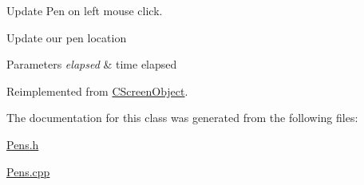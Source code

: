 Update Pen on left mouse click. 

Update our pen location 
\begin{DoxyParams}{Parameters}
{\em elapsed} & time elapsed \\
\hline
\end{DoxyParams}


Reimplemented from \mbox{\hyperlink{class_c_screen_object_ab682c1e08f001e666f0cec280e1e9eaa}{C\+Screen\+Object}}.



The documentation for this class was generated from the following files\+:\begin{DoxyCompactItemize}
\item 
\mbox{\hyperlink{_pens_8h}{Pens.\+h}}\item 
\mbox{\hyperlink{_pens_8cpp}{Pens.\+cpp}}\end{DoxyCompactItemize}
